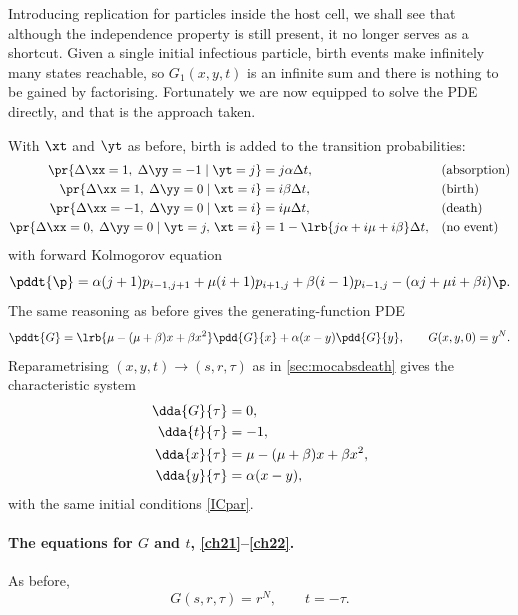 Introducing replication for particles inside the host cell, we shall see that
although the independence property is still present, it no longer serves as a
shortcut. Given a single initial infectious particle, birth events make infinitely
many states reachable, so $G_1(x,y,t)$ is an infinite sum and there is nothing to be
gained by factorising. Fortunately we are now equipped to solve the PDE directly,
and that is the approach taken.

With $\xt$ and $\yt$ as before, birth is added to the transition probabilities:
\begin{align*}
     \pr{\Delta\xx= 1,\;\Delta\yy = -1 \;|\; \yt = j} &= j \alpha \Delta t,  &&\text{(absorption)}\\
     \pr{\Delta\xx= 1,\;\Delta\yy = 0 \;|\; \xt = i} &= i \beta \Delta t,  &&\text{(birth)}\\
      \pr{\Delta\xx= -1,\;\Delta\yy = 0 \;|\; \xt = i} &= i \mu \Delta t,  &&\text{(death)}\\
     \pr{\Delta\xx= 0,\;\Delta\yy = 0 \;|\; \yt = j,\, \xt=i} &= 1 -  \lrb{ j\alpha + i\mu + i\beta}\Delta t,  &&\text{(no event)}
\end{align*}
with forward Kolmogorov equation
\begin{equation}
\label{FK3}
\pddt{\p} = \alpha(j+1)p_{i-1,j+1} + \mu(i+1)p_{i+1,j} + \beta(i-1)p_{i-1,j} - (\alpha j + \mu i + \beta i)\p .
\end{equation}
The same reasoning as before gives the generating-function PDE
\begin{equation}
\label{PDE3}
\pddt{G} = \lrb{\mu - (\mu+\beta)x + \beta x^2}\pdd{G}{x} + \alpha(x-y)\pdd{G}{y},
\qquad G(x,y,0) = y^N .
\end{equation}
Reparametrising $(x,y,t)\to(s,r,\tau)$ as in \cref{sec:mocabsdeath} gives the
characteristic system
\begin{align}
\dda{G}{\tau} &= 0, \label{ch21}\\
\dda{t}{\tau} &= -1, \label{ch22}\\
\dda{x}{\tau} &= \mu-(\mu+\beta)x + \beta x^2, \label{ch23}\\
\dda{y}{\tau} &= \alpha(x-y), \label{ch24}
\end{align}
with the same initial conditions \cref{ICpar}.

\paragraph{The equations for $G$ and $t$, \eqref{ch21}--\eqref{ch22}.}
As before,
\begin{equation}
\label{gngngn}
G(s,r,\tau) = r^N,
\qquad t = -\tau .
\end{equation}

